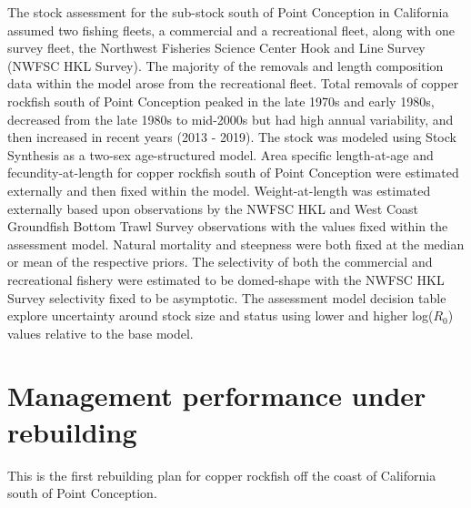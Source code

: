 \documentclass[11pt,
  english,
  a4paper,
]{article}
\begin{document}
The stock assessment for the sub-stock south of Point Conception in California assumed two fishing fleets, a commercial and a recreational fleet, along with one survey fleet, the Northwest Fisheries Science Center Hook and Line Survey (NWFSC HKL Survey). The majority of the removals and length composition data within the model arose from the recreational fleet. Total removals of copper rockfish south of Point Conception peaked in the late 1970s and early 1980s, decreased from the late 1980s to mid-2000s but had high annual variability, and then increased in recent years (2013 - 2019). The stock was modeled using Stock Synthesis as a two-sex age-structured model. Area specific length-at-age and fecundity-at-length for copper rockfish south of Point Conception were estimated externally and then fixed within the model. Weight-at-length was estimated externally based upon observations by the NWFSC HKL and West Coast Groundfish Bottom Trawl Survey observations with the values fixed within the assessment model. Natural mortality and steepness were both fixed at the median or mean of the respective priors. The selectivity of both the commercial and recreational fishery were estimated to be domed-shape with the NWFSC HKL Survey selectivity fixed to be asymptotic. The assessment model decision table explore uncertainty around stock size and status using lower and higher log({\(R_0\)\leavevmode\tagmcend\tagstructend}) values relative to the base model.

\leavevmode\tagmcend\tagstructend\par

\clearpage


\hypertarget{management-performance-under-rebuilding}{%
\section{Management performance under rebuilding}\label{management-performance-under-rebuilding}}

\leavevmode\tagmcend\tagstructend


This is the first rebuilding plan for copper rockfish off the coast of California south of Point Conception.

\leavevmode\tagmcend\tagstructend\par

\end{document}
